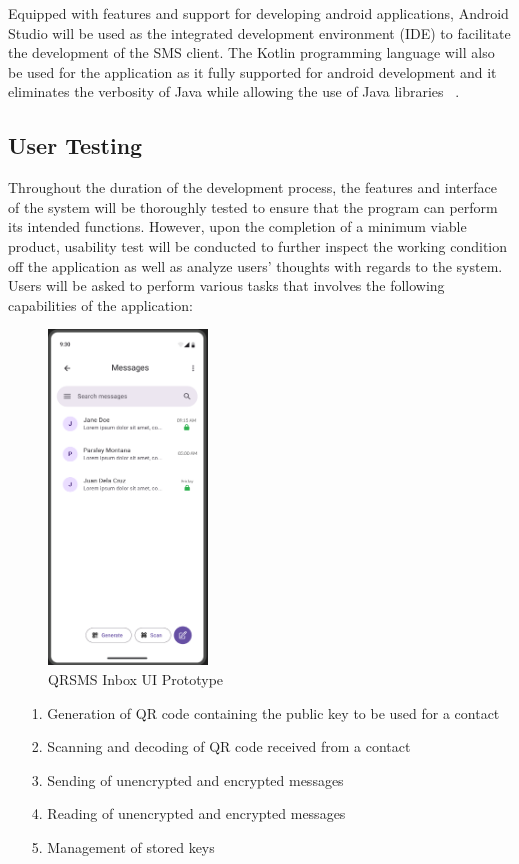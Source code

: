\documentclass[journal]{./IEEE/IEEEtran}
\begin{document}
Equipped with features and support for developing android applications,
Android Studio will be used as the integrated development environment (IDE)
to facilitate the development of the SMS client.
The Kotlin programming language will also be used for the application as it
fully supported for android development and it eliminates the verbosity
of Java while allowing the use of Java libraries
~\cite{Moskala_Wojda_2017}.

\subsection{User Testing}
Throughout the duration of the development process, the features and interface
of the system will be thoroughly tested to ensure that the program can perform
its intended functions. However, upon the completion of a minimum viable
product, usability test will be conducted to further inspect the working
condition off the application as well as analyze users' thoughts with regards
to the system. Users will be asked to perform various tasks that involves the
following capabilities of the application:

\begin{figure}
	\centering
	\includegraphics[height=3.5in]{./images/QRSMS_inbox.png}
	\caption{QRSMS Inbox UI Prototype}
	\label{QRSMSUI}
\end{figure}

\begin{itemize}
	\item[1.] Generation of QR code containing the public key to be used for
		a contact
	\item[2.] Scanning and decoding of QR code received from a contact
	\item[3.] Sending of unencrypted and encrypted messages
	\item[4.] Reading of unencrypted and encrypted messages
	\item[5.] Management of stored keys
\end{itemize}
\end{document}
